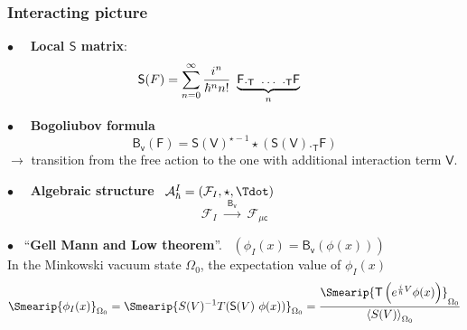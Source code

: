 \documentclass[9pt]{beamer}
\newcommand{\Acal}{\mathcal{A}}
\newcommand{\Fcal}{\mathcal{F}}
\newcommand{\Bsf}{\mathsf{B}}
\newcommand{\Fsf}{\mathsf{F}}
\newcommand{\Ssf}{\mathsf{S}}
\newcommand{\Tsf}{\mathsf{T}}
\newcommand{\Vsf}{\mathsf{V}}
\newcommand{\csf}{\mathsf{c}}
\newcommand{\vsf}{\mathsf{v}}
\begin{document}
\begin{frame}

\frametitle{Interacting picture}

\vfill

$\bullet \quad$ \textbf{Local $\Ssf$ matrix}:
\vspace*{-17pt}
\begin{equation*}
 \hspace*{-25pt} \Ssf(F) = \sum_{n=0}^{\infty} \frac{i^n}{\hbar^n n!} \ \underbrace{\Fsf ._\Tsf \ \dots \ ._\Tsf \Fsf}_{n}
\end{equation*}

\vfill

$\bullet \quad$ \textbf{Bogoliubov formula}  \\[-10pt]
\begin{equation*}
 \Bsf_\vsf(\Fsf) = \Ssf(\Vsf)^{\star -1} \star \left( \Ssf(\Vsf) ._{\Tsf} \Fsf \right) 
\end{equation*}
$\to$  transition from the free action to the one with additional interaction term $\Vsf$.

\vfill

$\bullet \quad$ \textbf{Algebraic structure} \ $\Acal^I_\hbar = \left( \Fcal_{I} , \star , \Tdot \right)$
\begin{equation*}
\Fcal_{I} \ \overset{\ \ \Bsf_\vsf \ \ }{\longrightarrow} \ \Fcal_{\mu \csf}
\end{equation*}

\vfill

$\bullet$ \ ``\textbf{Gell Mann and Low theorem}''. \ $\left( \phi_I(x) = \Bsf_\vsf(\phi(x)) \right)$ \\

\hspace*{9pt} In the Minkowski vacuum state $\Omega_0$, the expectation value of $\phi_I(x)$
\vspace*{-6pt}
\begin{equation*}
\Smearip{ \phi_I(x) }_{\Omega_0} 
= 
\Smearip{ S(V)^{-1} T( \Ssf(V) \ \phi(x)) }_{\Omega_0} 
= 
\frac{%
\Smearip{ \Tsf\left(e^{\frac{i}{\hbar} V} \phi(x) \right) }_{\Omega_0}
}{%
\left\langle S(V) \right\rangle_{\Omega_0}
}
\end{equation*}

\end{frame}  

\end{document}
